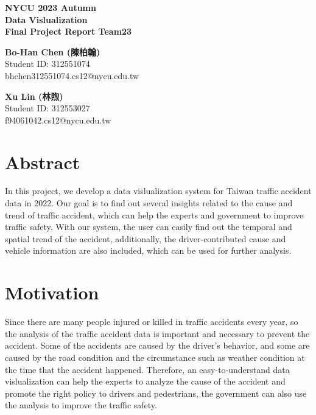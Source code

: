 \documentclass[a4paper, oneside, final, 12pt]{scrartcl} %
\begin{document}


\begin{center}
    {\fontsize{18}{30}\textbf{NYCU 2023 Autumn \\ Data Vislualization \\ Final Project Report Team23}} \\
\end{center}

  \begin{minipage}[t]{0.45\textwidth}
    \begin{center}
      \textbf{Bo-Han Chen (陳柏翰)} \\
      Student ID: 312551074 \\
      bhchen312551074.cs12@nycu.edu.tw
    \end{center}
  \end{minipage}
  \begin{minipage}[t]{0.45\textwidth}
    \begin{center}
      \textbf{Xu Lin (林煦)} \\
      Student ID: 312553027 \\
      f94061042.cs12@nycu.edu.tw
    \end{center}
  \end{minipage}

\section{Abstract}

  In this project, we develop a data vislualization system for
  Taiwan traffic accident data in 2022.
  Our goal is to find out several insights
  related to the cause and trend of traffic accident,
  which can help the experts and government to improve traffic safety.
  With our system, the user can easily find out the temporal and spatial trend of the accident,
  additionally, the driver-contributed cause and vehicle information 
  are also included, which can be used for further analysis.

\section{Motivation}

  Since there are many people injured or killed in traffic accidents every year,
  so the analysis of the traffic accident data 
  is important and necessary to prevent the accident.
  Some of the accidents are caused by the driver's behavior,
  and some are caused by the road condition 
  and the circumstance such as weather condition at the time that the accident happened.
  Therefore, an easy-to-understand data vislualization 
  can help the experts to analyze the cause of the accident
  and promote the right policy to drivers and pedestrians,
  the government can also use the analysis to improve the traffic safety.
  
\end{document}
